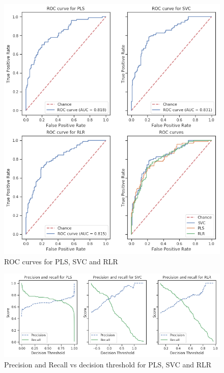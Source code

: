 \documentclass[shortabstract, english, mgr]{iithesis}
\begin{document}
\begin{figure}
\centering
\includegraphics[width=\textwidth]{images/rocTest.png}
\caption{ROC curves for PLS, SVC and RLR}
\label{fig:rocTest}
\end{figure}

\begin{figure}
\centering
\includegraphics[width=1.05\textwidth]{images/PRvsThresh.png}
\caption{Precision and Recall vs decision threshold for PLS, SVC and RLR}
\label{fig:thresholds}
\end{figure}
\end{document}
